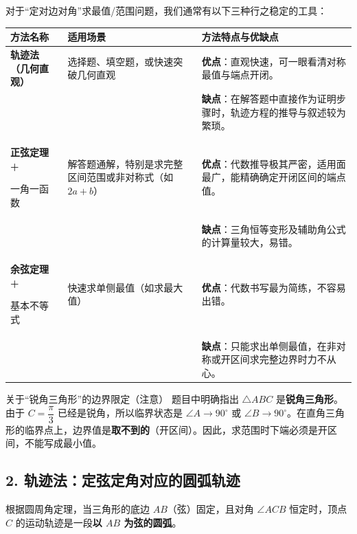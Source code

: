 \documentclass[11pt, a4paper]{ctexart}
\begin{document}
对于“定对边对角”求最值/范围问题，我们通常有以下三种行之稳定的工具：
\begin{center}
\renewcommand{\arraystretch}{1.25}
\begin{tabularx}{\linewidth}{>{\bfseries}p{2.5cm} X X}
\toprule
方法名称 & 适用场景 & 方法特点与优缺点 \\
\midrule
轨迹法（几何直观） & 选择题、填空题，或快速突破几何直观 & \textbf{优点}：直观快速，可一眼看清对称最值与端点开闭。\\
 & & \textbf{缺点}：在解答题中直接作为证明步骤时，轨迹方程的推导与叙述较为繁琐。\\
\midrule
正弦定理 + \par 一角一函数 & 解答题通解，特别是求完整区间范围或非对称式（如 $2a+b$） & \textbf{优点}：代数推导极其严密，适用面最广，能精确确定开闭区间的端点值。\\
 & & \textbf{缺点}：三角恒等变形及辅助角公式的计算量较大，易错。\\
\midrule
余弦定理 + \par 基本不等式 & 快速求单侧最值（如求最大值） & \textbf{优点}：代数书写最为简练，不容易出错。\\
 & & \textbf{缺点}：只能求出单侧最值，在非对称或开区间求完整边界时力不从心。\\
\bottomrule
\end{tabularx}
\end{center}

\begin{conceptbox}{关于“锐角三角形”的边界限定（注意）}
题目中明确指出 $\triangle ABC$ 是\textbf{锐角三角形}。由于 $C = \dfrac{\pi}{3}$ 已经是锐角，所以临界状态是 $\angle A \to 90^\circ$ 或 $\angle B \to 90^\circ$。在直角三角形的临界点上，边界值是\textbf{取不到的}（开区间）。因此，求范围时下端必须是开区间，不能写成最小值。
\end{conceptbox}

\subsection{2. 轨迹法：定弦定角对应的圆弧轨迹}
根据圆周角定理，当三角形的底边 $AB$（弦）固定，且对角 $\angle ACB$ 恒定时，顶点 $C$ 的运动轨迹是一段\textbf{以 $AB$ 为弦的圆弧}。
\end{document}
